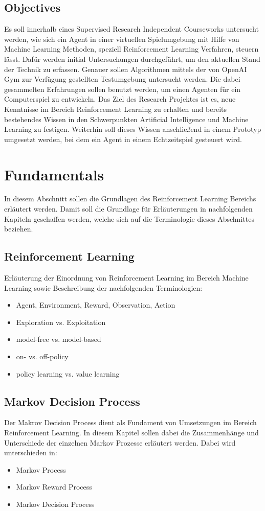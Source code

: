 \documentclass[11pt]{scrartcl}
\begin{document}
\subsection{Objectives}
Es soll innerhalb eines Supervised Research Independent Courseworks untersucht werden, wie
sich ein Agent in einer virtuellen Spielumgebung mit Hilfe von Machine Learning Methoden,
speziell Reinforcement Learning Verfahren, steuern lässt. Dafür werden initial
Untersuchungen durchgeführt, um den aktuellen Stand der Technik zu erfassen. Genauer
sollen Algorithmen mittels der von OpenAI Gym zur Verfügung gestellten Testumgebung
untersucht werden. Die dabei gesammelten Erfahrungen sollen benutzt werden, um einen
Agenten für ein Computerspiel zu entwickeln. Das Ziel des Research Projektes ist es, neue
Kenntnisse im Bereich Reinforcement Learning zu erhalten und bereits bestehendes Wissen in
den Schwerpunkten Artificial Intelligence und Machine Learning zu festigen. Weiterhin soll
dieses Wissen anschließend in einem Prototyp umgesetzt werden, bei dem ein Agent in einem
Echtzeitspiel gesteuert wird.

\newpage
\section{Fundamentals}
In diesem Abschnitt sollen die Grundlagen des Reinforcement Learning Bereichs erläu\-tert
werden. Damit soll die Grundlage für Erläuterungen in nachfolgenden Kapiteln geschaffen
werden, welche sich auf die Terminologie dieses Abschnittes beziehen.
\subsection{Reinforcement Learning}
Erläuterung der Einordnung von Reinforcement Learning im Bereich Machine Learning sowie Beschreibung der nachfolgenden Terminologien:
\begin{itemize}
\itemsep0pt
\item Agent, Environment, Reward, Observation, Action
\item Exploration vs. Exploitation
\item model-free vs. model-based
\item on- vs. off-policy
\item policy learning vs. value learning
\end{itemize}
\subsection{Markov Decision Process}
Der Makrov Decision Process dient als Fundament von Umsetzungen im Bereich Reinforcement Learning. In diesem Kapitel sollen dabei die Zusammenhänge und Unterschiede der einzelnen Markov Prozesse erläutert werden. Dabei wird unterschieden in:
\begin{itemize}
\itemsep0pt
\item Markov Process
\item Markov Reward Process
\item Markov Decision Process 
\end{itemize}
\end{document}
